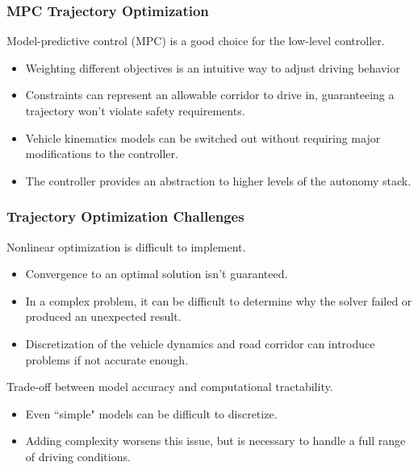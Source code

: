 \documentclass{beamer}
\begin{document}
\begin{frame}
\frametitle{MPC Trajectory Optimization}
Model-predictive control (MPC) is a good choice for the low-level controller.
\begin{itemize}
\item Weighting different objectives is an intuitive way to adjust driving behavior
\item Constraints can represent an allowable corridor to drive in, guaranteeing a trajectory won't violate safety requirements.
\item Vehicle kinematics models can be switched out without requiring major modifications to the controller.
\item The controller provides an abstraction to higher levels of the autonomy stack.
\end{itemize}


\end{frame}

\begin{frame}
\frametitle{Trajectory Optimization Challenges}
Nonlinear optimization is difficult to implement.
\begin{itemize}
	\item Convergence to an optimal solution isn't guaranteed.
	\item In a complex problem, it can be difficult to determine why the solver failed or produced an unexpected result.
	\item Discretization of the vehicle dynamics and road corridor can introduce problems if not accurate enough.
\end{itemize}

Trade-off between model accuracy and computational tractability.
\begin{itemize}
	\item Even ``simple" models can be difficult to discretize.
	\item Adding complexity worsens this issue, but is necessary to handle a full range of driving conditions.%
\end{itemize}
\end{frame}
\end{document}
